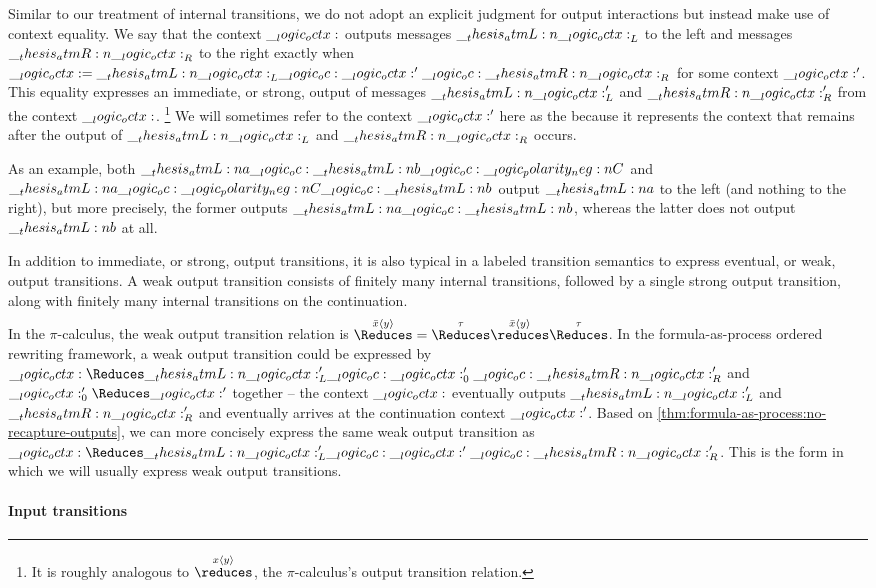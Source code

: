 Similar to our treatment of internal transitions, we do not adopt
an explicit judgment for output interactions but instead make use of context equality. 
We say that the context $\__logic_octx:$ outputs messages $\__thesis_atmL:n {\__logic_octx:}_L$ to the left and messages $\__thesis_atmR:n {\__logic_octx:}_R$ to the right exactly when $\__logic_octx: = \__thesis_atmL:n {\__logic_octx:}_L \__logic_oc: \__logic_octx:' \__logic_oc: \__thesis_atmR:n {\__logic_octx:}_R$ for some context $\__logic_octx:'$.
This equality expresses an immediate, or strong, output of messages $\__thesis_atmL:n {\__logic_octx:}'_L$ and $\__thesis_atmR:n {\__logic_octx:}'_R$ from the context $\__logic_octx:$.%
\footnote{It is roughly analogous to $\overset{x\langle y\rangle}{\reduces}$, the $\pi$-calculus's output transition relation.}
We will sometimes refer to the context $\__logic_octx:'$ here as the  because it represents the context that remains after the output of $\__thesis_atmL:n {\__logic_octx:}_L$ and $\__thesis_atmR:n {\__logic_octx:}_R$ occurs.

As an example, both $\__thesis_atmL:n {a} \__logic_oc: \__thesis_atmL:n {b} \__logic_oc: \__logic_polarity_neg:n {C}$ and $\__thesis_atmL:n {a} \__logic_oc: \__logic_polarity_neg:n {C} \__logic_oc: \__thesis_atmL:n {b}$ output $\__thesis_atmL:n {a}$ to the left (and nothing to the right), but more precisely, the former outputs $\__thesis_atmL:n {a} \__logic_oc: \__thesis_atmL:n {b}$, whereas the latter does not output $\__thesis_atmL:n {b}$ at all.

In addition to immediate, or strong, output transitions, it is also typical in a labeled transition semantics to express eventual, or weak, output transitions.
A weak output transition consists of finitely many internal transitions, followed by a single strong output transition, along with finitely many internal transitions on the continuation.

In the $\pi$-calculus, the weak output transition relation is $\mathord{\overset{\smash{\bar{x}\langle y\rangle}}{\Reduces}} = \mathord{\overset{\smash{\tau}}{\Reduces}\overset{\smash{\bar{x}\langle y\rangle}}{\reduces}\overset{\smash{\tau}}{\Reduces}}$.
%
In the formula-as-process ordered rewriting framework, a weak output transition could be expressed by $\octx \Reduces \atmL{\octx}'_L \oc \octx'_0 \oc \atmR{\octx}'_R$ and $\octx'_0 \Reduces \octx'$ together -- the context $\__logic_octx:$ eventually outputs $\__thesis_atmL:n {\__logic_octx:}'_L$ and $\__thesis_atmR:n {\__logic_octx:}'_R$ and eventually arrives at the continuation context $\__logic_octx:'$.
Based on \cref{thm:formula-as-process:no-recapture-outputs}, we can more concisely express the same weak output transition as $\octx \Reduces \atmL{\octx}'_L \oc \octx' \oc \atmR{\octx}'_R$.
This is the form in which we will usually express weak output transitions.

\paragraph*{Input transitions}

